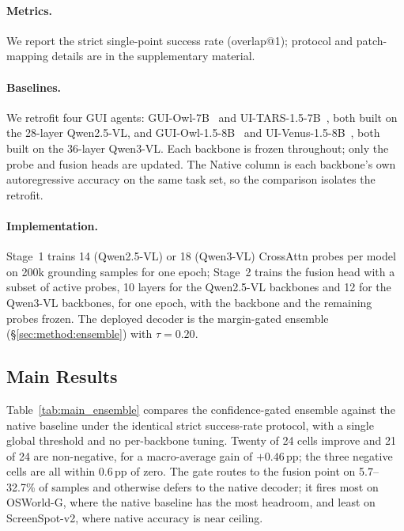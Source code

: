 \paragraph{Metrics.}
We report the strict single-point success rate (overlap@1); protocol and patch-mapping details are in the supplementary material.

\paragraph{Baselines.}
We retrofit four GUI agents: GUI-Owl-7B~\citep{ye2025guiowl} and UI-TARS-1.5-7B~\citep{qin2025uitars}, both built on the 28-layer Qwen2.5-VL, and GUI-Owl-1.5-8B~\citep{xu2026mobile} and UI-Venus-1.5-8B~\citep{team2026ui}, both built on the 36-layer Qwen3-VL. Each backbone is frozen throughout; only the probe and fusion heads are updated. The Native column is each backbone's own autoregressive accuracy on the same task set, so the comparison isolates the retrofit.

\paragraph{Implementation.}
Stage~1 trains 14 (Qwen2.5-VL) or 18 (Qwen3-VL) CrossAttn probes per model on 200k grounding samples for one epoch; Stage~2 trains the fusion head with a subset of active probes, 10 layers for the Qwen2.5-VL backbones and 12 for the Qwen3-VL backbones, for one epoch, with the backbone and the remaining probes frozen. The deployed decoder is the margin-gated ensemble (\S\ref{sec:method:ensemble}) with $\tau{=}0.20$.

\subsection{Main Results}
\label{sec:experiments:main}

Table~\ref{tab:main_ensemble} compares the confidence-gated ensemble against the native baseline under the identical strict success-rate protocol, with a single global threshold and no per-backbone tuning. Twenty of 24 cells improve and 21 of 24 are non-negative, for a macro-average gain of $+0.46$\,pp; the three negative cells are all within $0.6$\,pp of zero. The gate routes to the fusion point on 5.7--32.7\% of samples and otherwise defers to the native decoder; it fires most on OSWorld-G, where the native baseline has the most headroom, and least on ScreenSpot-v2, where native accuracy is near ceiling.

